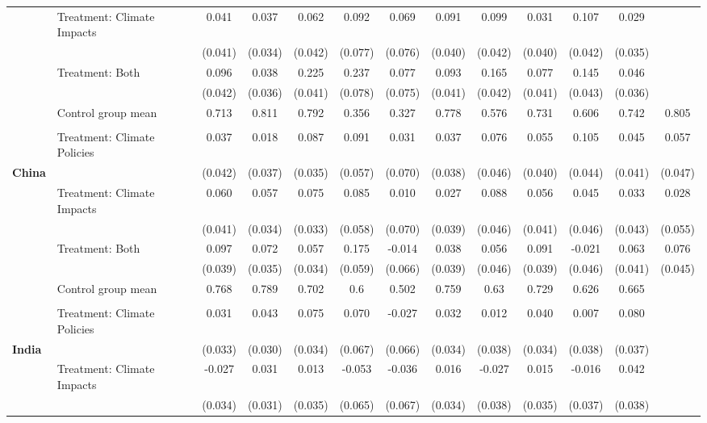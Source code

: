 \begin{tabular}[t]{llccccccccccc}
 & Treatment: Climate Impacts & 0.041 & 0.037 & 0.062 & 0.092 & 0.069 & 0.091 & 0.099 & 0.031 & 0.107 & 0.029\\
 &  & (0.041) & (0.034) & (0.042) & (0.077) & (0.076) & (0.040) & (0.042) & (0.040) & (0.042) & (0.035)\\
 & Treatment: Both & 0.096 & 0.038 & 0.225 & 0.237 & 0.077 & 0.093 & 0.165 & 0.077 & 0.145 & 0.046\\
 &  & (0.042) & (0.036) & (0.041) & (0.078) & (0.075) & (0.041) & (0.042) & (0.041) & (0.043) & (0.036)\\
\midrule
 & Control group mean & 0.713 & 0.811 & 0.792 & 0.356 & 0.327 & 0.778 & 0.576 & 0.731 & 0.606 & 0.742 & 0.805\\
 &  &  &  &  &  &  &  &  &  &  &  & \\
 & Treatment: Climate Policies & 0.037 & 0.018 & 0.087 & 0.091 & 0.031 & 0.037 & 0.076 & 0.055 & 0.105 & 0.045 & 0.057\\
\textbf{China} &  & (0.042) & (0.037) & (0.035) & (0.057) & (0.070) & (0.038) & (0.046) & (0.040) & (0.044) & (0.041) & (0.047)\\
 & Treatment: Climate Impacts & 0.060 & 0.057 & 0.075 & 0.085 & 0.010 & 0.027 & 0.088 & 0.056 & 0.045 & 0.033 & 0.028\\
 &  & (0.041) & (0.034) & (0.033) & (0.058) & (0.070) & (0.039) & (0.046) & (0.041) & (0.046) & (0.043) & (0.055)\\
 & Treatment: Both & 0.097 & 0.072 & 0.057 & 0.175 & -0.014 & 0.038 & 0.056 & 0.091 & -0.021 & 0.063 & 0.076\\
 &  & (0.039) & (0.035) & (0.034) & (0.059) & (0.066) & (0.039) & (0.046) & (0.039) & (0.046) & (0.041) & (0.045)\\
\midrule
 & Control group mean & 0.768 & 0.789 & 0.702 & 0.6 & 0.502 & 0.759 & 0.63 & 0.729 & 0.626 & 0.665\\
 &  &  &  &  &  &  &  &  &  &  & \\
 & Treatment: Climate Policies & 0.031 & 0.043 & 0.075 & 0.070 & -0.027 & 0.032 & 0.012 & 0.040 & 0.007 & 0.080\\
\textbf{India} &  & (0.033) & (0.030) & (0.034) & (0.067) & (0.066) & (0.034) & (0.038) & (0.034) & (0.038) & (0.037)\\
 & Treatment: Climate Impacts & -0.027 & 0.031 & 0.013 & -0.053 & -0.036 & 0.016 & -0.027 & 0.015 & -0.016 & 0.042\\
 &  & (0.034) & (0.031) & (0.035) & (0.065) & (0.067) & (0.034) & (0.038) & (0.035) & (0.037) & (0.038)\\

\end{tabular}
